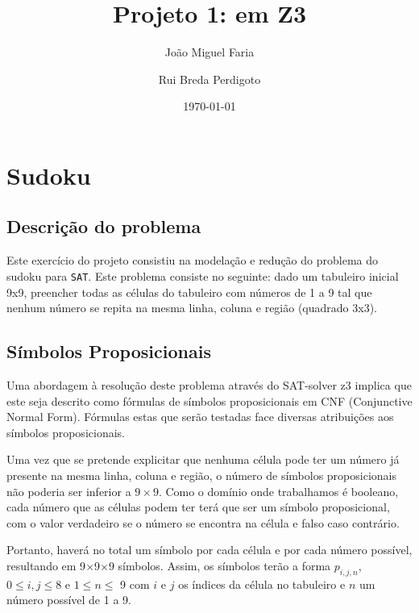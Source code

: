 \documentclass[a4paper,12pt]{article}
\title{Projeto 1: \sat em {Z3}}
\author{João Miguel Faria \and Rui Breda Perdigoto}
\date{\today}
\theoremstyle{definition}
\theoremstyle{theorem}
\theoremstyle{remark}
\newcommand{\sat}{\texttt{SAT}\xspace}
\begin{document}
\maketitle

\section{Sudoku}

\subsection{Descrição do problema}
Este exercício do projeto consistiu na modelação e redução do problema do
sudoku para \sat. Este problema consiste no seguinte: dado um tabuleiro inicial
9x9, preencher todas as células do tabuleiro com números de 1 a 9 tal que
nenhum número se repita na mesma linha, coluna e região (quadrado 3x3).

\subsection{Símbolos Proposicionais}
Uma abordagem à resolução deste problema através do SAT-solver z3 implica que
este seja descrito como fórmulas de símbolos proposicionais em CNF (Conjunctive
Normal Form). Fórmulas estas que serão testadas face diversas atribuições aos
símbolos proposicionais.

Uma vez que se pretende explicitar que nenhuma célula pode ter um número já
presente na mesma linha, coluna e região, o número de símbolos proposicionais
não poderia ser inferior a $9\times9$. Como o domínio onde trabalhamos é
booleano, cada número que as células podem ter terá que ser um símbolo
proposicional, com o valor verdadeiro se o número se encontra na célula e falso
caso contrário.
 
Portanto, haverá no total um símbolo por cada célula e por cada número
possível, resultando em 9$\times$9$\times$9 símbolos. Assim, os símbolos terão
a forma $p_{i,j,n}$, $0\leq i, j \leq 8$
e $1 \leq n \leq$ 9 com $i$ e $j$ os índices da célula no tabuleiro e $n$ um
número possível de 1 a 9.
\end{document}
